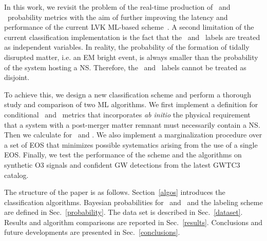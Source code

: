 In this work, we revisit the problem of the real-time production of \hasns\ and \hasrem\ probability metrics with the aim of further improving the latency and performance of the
current \ac{LVK} \ac{ML}-based scheme~\cite{Chatterjee:2019avs}.  A second limitation of the current  classification implementation is the fact that the \hasns\ and \hasrem\ labels are treated as independent variables. In reality, the probability of the formation of
tidally disrupted matter, i.e. an \ac{EM} bright event, is always smaller than the probability of the system hosting a \ac{NS}. Therefore, the \hasns\ and \hasrem\ labels cannot be
treated as disjoint.  

To achieve this, we design a new classification scheme and perform a thorough study and comparison of two \ac{ML} algorithms. We first implement a definition for conditional \hasns\ and
\hasrem\ metrics that incorporates \emph{ab initio} the physical requirement that a system with a post-merger matter remnant must necessarily contain a \ac{NS}. Then we calculate
 for \hasns\ and \hasrem. We also implement a marginalization procedure over a set of \ac{EOS} that minimizes possible systematics arising from the use of a
single \ac{EOS}. Finally, we test the performance of the scheme and the algorithms on synthetic \ac{O3} signals and confident \ac{GW} detections from the latest \ac{GWTC3} catalog.

The structure of the paper is as follows. Section~\ref{algos} introduces the classification algorithms. Bayesian probabilities for \hasns\ and \hasrem\ and the labeling scheme are defined
in Sec.~\ref{probability}. The data set is described in Sec.~\ref{dataset}. Results and algorithm comparisons are reported in Sec.~\ref{results}. Conclusions and future developments are
presented in Sec.~\ref{conclusions}.  
